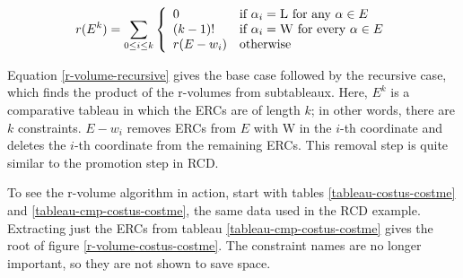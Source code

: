 \documentclass[11pt]{article}
\begin{document}
\begin{equation}
  r(E^k) = \sum_{0\leq{}i\leq{}k} \left\{
    \begin{array}{ll}
      0 & \textrm{if } \alpha_i = \textrm{{\sc L} for any }
      \alpha \in E \\
      (k-1)! & \textrm{if } \alpha_i = \textrm{{\sc W} for every }
      \alpha \in E \\
      r(E-w_i) & \textrm{otherwise} \\
    \end{array} \right.
  \label{r-volume-recursive}
\end{equation}

Equation \ref{r-volume-recursive} gives the base case followed by the
recursive case, which finds the product of the r-volumes from
subtableaux. Here, $E^k$ is a comparative tableau in which the ERCs
are of length $k$; in other words, there are $k$ constraints. $E -
w_i$ removes ERCs from $E$ with {\sc W} in the $i$-th coordinate and
deletes the $i$-th coordinate from the remaining ERCs. This removal
step is quite similar to the promotion step in RCD.

To see the r-volume algorithm in action, start with tables
\ref{tableau-costus-costme} and \ref{tableau-cmp-costus-costme}, the
same data used in the RCD example. Extracting just the ERCs from
tableau \ref{tableau-cmp-costus-costme} gives the root of figure
\ref{r-volume-costus-costme}. The constraint names are no
longer important, so they are not shown to save space.
\end{document}
